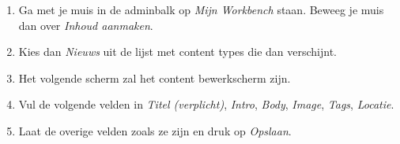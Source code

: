 \begin{enumerate}
\item Ga met je muis in de adminbalk op \emph{Mijn Workbench} staan. Beweeg je muis dan over \emph{Inhoud aanmaken}.
\item Kies dan \emph{Nieuws} uit de lijst met content types die dan verschijnt.

\begin{center}
\end{center}

\item Het volgende scherm zal het content bewerkscherm zijn.

\begin{center}
\end{center}

\item Vul de volgende velden in \emph{Titel (verplicht)}, \emph{Intro}, \emph{Body}, \emph{Image}, \emph{Tags}, \emph{Locatie}.
\item Laat de overige velden zoals ze zijn en druk op \emph{Opslaan}.
\end{enumerate}

